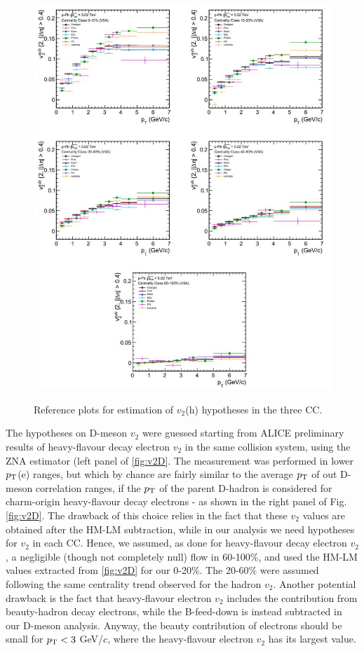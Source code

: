 \begin{figure}
\centering
{\includegraphics[width=0.95\linewidth]{figuresVsCent/Global/v2/NewV2h.JPG}}
 \caption{Reference plots for estimation of $v_2$(h) hypotheses in the three CC.}
\label{fig:v2h}
\end{figure}

The hypotheses on D-meson $v_2$ were guessed starting from ALICE preliminary results of heavy-flavour decay electron $v_2$ in the same collision system, using the ZNA estimator (left panel of \ref{fig:v2D}. The measurement was performed in lower $p_{\rm T}$(e) ranges, but which by chance are fairly similar to the average $p_{\rm T}$ of out D-meson correlation ranges, if the $p_{\rm T}$ of the parent D-hadron is considered for charm-origin heavy-flavour decay electrons - as shown in the right panel of Fig. \ref{fig:v2D}. The drawback of this choice relies in the fact that these $v_2$ values are obtained after the HM-LM subtraction, while in our analysis we need hypotheses for $v_2$ in each CC.
Hence, we assumed, as done for heavy-flavour decay electron $v_2$, a negligible (though not completely null) flow in 60-100\%, and used the HM-LM values extracted from \ref{fig:v2D} for our 0-20\%. The 20-60\% were assumed following the same centrality trend observed for the hadron $v_2$. Another potential drawback is the fact that heavy-flavour electron $v_2$ includes the contribution from beauty-hadron decay electrons, while the B-feed-down is instead subtracted in our D-meson analysis. Anyway, the beauty contribution of electrons should be small for $p_{\rm T} < 3$ GeV/$c$, where the heavy-flavour electron $v_2$ has its largest value.

